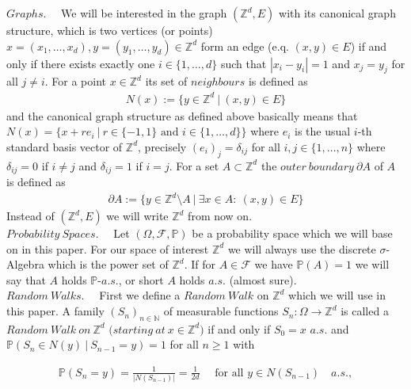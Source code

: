 \documentclass[12pt,a4paper]{scrartcl}
\numberwithin{equation}{subsection}
\numberwithin{equation}{section}
\theoremstyle{definition}
\begin{document}
\noindent $\boldsymbol{\mathit{Graphs}}.\quad$ We will be interested in the graph $(\mathbb{Z}^d, E)$ with its canonical graph structure, which is two vertices (or points) $x=(x_1,\dots,x_d),y=(y_1,\dots,y_d)\in \mathbb{Z}^d$ form an edge (e.q. $(x,y)\in E$) if and only if there exists exactly one $i\in \{1,\dots, d\}$ such that $|x_i - y_i| = 1$ and $x_j = y_j$ for all $j\neq i$. For a point $x\in \mathbb{Z}^d$ its set of $\mathit{neighbours}$ is defined as 
\begin{align*}
	N(x) := \{y\in \mathbb{Z}^d\ |\ (x,y)\in E\}
\end{align*}
and the canonical graph structure as defined above basically means that $N(x) = \{x+re_i\ |\ r\in \{-1,1\}\text{ and } i\in \{1,\dots, d\}\}$ where $e_i$ is the usual $i$-th standard basis vector of $\mathbb{Z}^d$, precisely $(e_i)_j=\delta_{ij}$ for all $i,j\in \{1, \dots , n \}$ where $\delta_{ij}=0$ if $i\neq j$ and $\delta_{ij}=1$ if $i=j$. For a set $A\subset \mathbb{Z}^d$ the $\mathit{outer\ boundary}\ \partial A$ of $A$ is defined as 
\begin{align*}
	\partial A := \{y\in \mathbb{Z}^d\setminus A\ |\ \exists x\in A:\ (x,y)\in E\}
\end{align*}
Instead of $(\mathbb{Z}^d, E)$ we will write $\mathbb{Z}^d$ from now on. 
\\

\noindent $\boldsymbol{\mathit{Probability\ Spaces}}.\quad$ Let $(\Omega,\mathcal{F}, \mathbb{P})$ be a probability space which we will base on in this paper. For our space of interest $\mathbb{Z}^d$ we will always use the discrete $\sigma$-Algebra which is the power set of $\mathbb{Z}^d$. If for $A\in \mathcal{F}$ we have $\mathbb{P}(A)=1$ we will say that $A$ holds $\mathbb{P}$-$a.s.$, or short $A$ holds $a.s.$ (almost sure).
\\

\noindent $\boldsymbol{\mathit{Random\ Walks}}.\quad$ First we define a $\mathit{Random\ Walk}$ on $\mathbb{Z}^d$ which we will use in this paper. A family $(S_n)_{n\in \mathbb{N}}$ of measurable functions $S_n: \Omega \to \mathbb{Z}^d$ is called a $\mathit{Random\ Walk\ on}\ \mathbb{Z}^d$ $\mathit{(starting\ at}\ x\in \mathbb{Z}^d)$ if and only if $S_0=x$ $a.s.$ and $\mathbb{P}(S_n\in N(y)\ |\ S_{n-1} = y) = 1$ for all $n \geq 1$ with 

\begin{align*}
	\mathbb{P}(S_n = y) = \frac{1}{|N(S_{n-1})|} = \frac{1}{2d}\quad \text{ for all }  y\in N(S_{n-1})\quad a.s., 
\end{align*}
\end{document}
